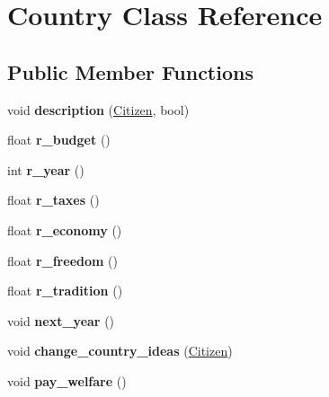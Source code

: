 \hypertarget{classCountry}{\section{Country Class Reference}
\label{classCountry}
}
\subsection*{Public Member Functions}
\begin{DoxyCompactItemize}
\item 
\hypertarget{classCountry_a1ee1ad4bc8ad02c5d7984fbbbec9e59a}{void {\bfseries description} (\hyperlink{classCitizen}{Citizen}, bool)}\label{classCountry_a1ee1ad4bc8ad02c5d7984fbbbec9e59a}

\item 
\hypertarget{classCountry_ae2e40771e1bff236aad7dd42b73b146c}{float {\bfseries r\+\_\+budget} ()}\label{classCountry_ae2e40771e1bff236aad7dd42b73b146c}

\item 
\hypertarget{classCountry_a48b49c96e2382142f72d8f94b020444c}{int {\bfseries r\+\_\+year} ()}\label{classCountry_a48b49c96e2382142f72d8f94b020444c}

\item 
\hypertarget{classCountry_a16186c9516ff8bf5f89453dc382f16c6}{float {\bfseries r\+\_\+taxes} ()}\label{classCountry_a16186c9516ff8bf5f89453dc382f16c6}

\item 
\hypertarget{classCountry_ae8c196516f9b25ad5ad3a473a39dbbc4}{float {\bfseries r\+\_\+economy} ()}\label{classCountry_ae8c196516f9b25ad5ad3a473a39dbbc4}

\item 
\hypertarget{classCountry_a79e830cfbca91ab9cf3b470a59686a5c}{float {\bfseries r\+\_\+freedom} ()}\label{classCountry_a79e830cfbca91ab9cf3b470a59686a5c}

\item 
\hypertarget{classCountry_ae9933daa5af50feed6e75864a64b5904}{float {\bfseries r\+\_\+tradition} ()}\label{classCountry_ae9933daa5af50feed6e75864a64b5904}

\item 
\hypertarget{classCountry_af47ff261b0835fe487aef92491975566}{void {\bfseries next\+\_\+year} ()}\label{classCountry_af47ff261b0835fe487aef92491975566}

\item 
\hypertarget{classCountry_a7beb62e8f51ed611fe34bb54f8ca84a7}{void {\bfseries change\+\_\+country\+\_\+ideas} (\hyperlink{classCitizen}{Citizen})}\label{classCountry_a7beb62e8f51ed611fe34bb54f8ca84a7}

\item 
\hypertarget{classCountry_ade5a82afc70bc8c751949dacdae5d0ac}{void {\bfseries pay\+\_\+welfare} ()}\label{classCountry_ade5a82afc70bc8c751949dacdae5d0ac}

\end{DoxyCompactItemize}
